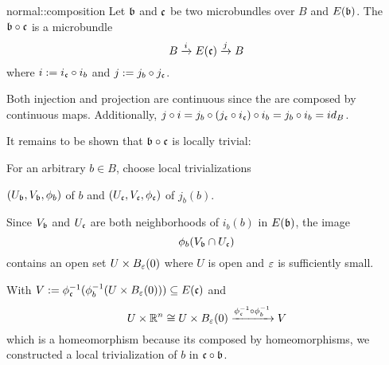 \begin{mydefinition}{normal::composition}
    Let $\bb$ and $\bc$ be two microbundles over $B$ and $E(\bb)$.
    The  $\bb \circ \bc$ is a microbundle
    \[ \bundle{B}{E(\bc)}{i}{j} \]
    where $i := i_\bc \circ i_b$ and $j := j_b \circ j_\bc$.
\end{mydefinition}

\begin{myproof}
    Both injection and projection are continuous since the are composed by continuous maps.
    Additionally, $j \circ i = j_b \circ (j_\bc \circ i_\bc) \circ i_b = j_b \circ i_b = id_B$.

    It remains to be shown that $\bb \circ \bc$ is locally trivial:

    For an arbitrary $b \in B$, choose local trivializations
    \begin{center}
        $(U_\bb, V_\bb, \phi_b)$ of $b$ and $(U_\bc, V_\bc, \phi_\bc)$ of $j_b(b)$.
    \end{center}
    Since $V_\bb$ and $U_\bc$ are both neighborhoods of $i_b(b)$ in $E(\bb)$, the image
    \[ \phi_b(V_\bb \cap U_\bc) \]
    contains an open set $U \times \ball[\eps]$ where $U$ is open and $\eps$ is sufficiently small.

    With $V := \inv{\phi_\bc}(\inv{\phi_b}(U \times \ball[\eps])) \sub E(\bc)$ and
    \[ U \times \R^n \cong U \times \ball[\eps] \xto{\inv{\phi_\bc} \circ \inv{\phi_b}} V \]
    which is a homeomorphism because its composed by homeomorphisms,
    we constructed a local trivialization of $b$ in $\bc \circ \bb$.
\end{myproof}